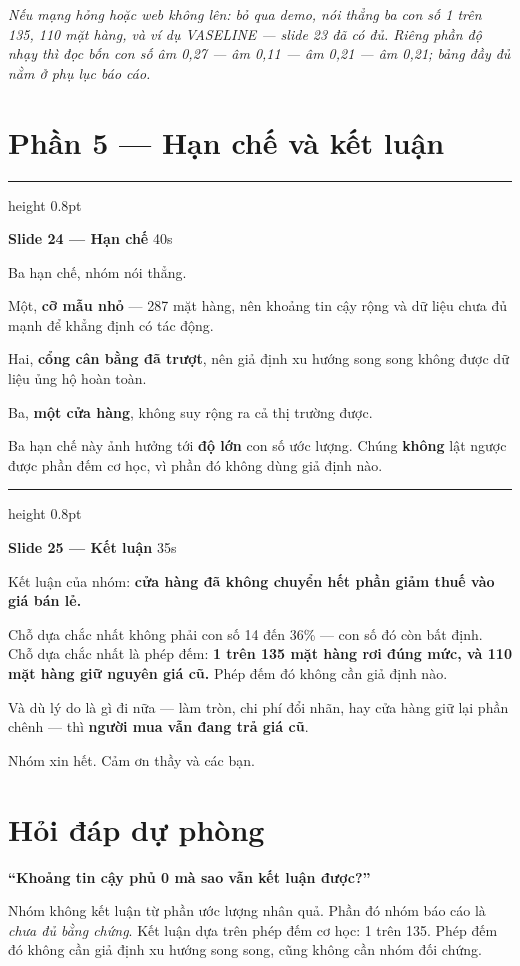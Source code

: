 \documentclass[12pt]{article}
\newcommand{\slidemuc}[4]{%
  \vspace{10pt}%
  {\color{vach}\hrule height 0.8pt}%
  \vspace{4pt}%
  {\large\bfseries Slide #1 — #2}%
  \hfill{\color{xam}\normalsize #3}%
  \ifx\relax#4\relax\else\\[2pt]{\bfseries\small #4}\fi%
  \vspace{4pt}\par%
}
\newenvironment{noi}%
  {\vspace{3pt}\begin{list}{}{%
     \setlength{\leftmargin}{14pt}\setlength{\rightmargin}{0pt}%
     \setlength{\itemindent}{0pt}\setlength{\listparindent}{0pt}%
     \setlength{\parsep}{5pt}}\item[]%
   \color{black}}%
  {\end{list}\vspace{2pt}}
\newcommand{\chidan}[1]{{\color{xam}\small\emph{#1}}\par}
\begin{document}
\chidan{Nếu mạng hỏng hoặc web không lên: bỏ qua demo, nói thẳng ba con số 1 trên
135, 110 mặt hàng, và ví dụ VASELINE --- slide 23 đã có đủ. Riêng phần độ nhạy thì
đọc bốn con số âm 0,27 --- âm 0,11 --- âm 0,21 --- âm 0,21; bảng đầy đủ nằm ở phụ lục
báo cáo.}

\section*{Phần 5 --- Hạn chế và kết luận}

\slidemuc{24}{Hạn chế}{40s}{\relax}
\begin{noi}
Ba hạn chế, nhóm nói thẳng.

Một, \textbf{cỡ mẫu nhỏ} --- 287 mặt hàng, nên khoảng tin cậy rộng và dữ liệu chưa
đủ mạnh để khẳng định có tác động.

Hai, \textbf{cổng cân bằng đã trượt}, nên giả định xu hướng song song không được dữ
liệu ủng hộ hoàn toàn.

Ba, \textbf{một cửa hàng}, không suy rộng ra cả thị trường được.

Ba hạn chế này ảnh hưởng tới \textbf{độ lớn} con số ước lượng. Chúng \textbf{không}
lật ngược được phần đếm cơ học, vì phần đó không dùng giả định nào.
\end{noi}

\slidemuc{25}{Kết luận}{35s}{\relax}
\begin{noi}
Kết luận của nhóm: \textbf{cửa hàng đã không chuyển hết phần giảm thuế vào giá bán
lẻ.}

Chỗ dựa chắc nhất không phải con số 14 đến 36\% --- con số đó còn bất định. Chỗ dựa
chắc nhất là phép đếm: \textbf{1 trên 135 mặt hàng rơi đúng mức, và 110 mặt hàng
giữ nguyên giá cũ.} Phép đếm đó không cần giả định nào.

Và dù lý do là gì đi nữa --- làm tròn, chi phí đổi nhãn, hay cửa hàng giữ lại phần
chênh --- thì \textbf{người mua vẫn đang trả giá cũ}.

Nhóm xin hết. Cảm ơn thầy và các bạn.
\end{noi}

\newpage
\section*{Hỏi đáp dự phòng}

\textbf{``Khoảng tin cậy phủ 0 mà sao vẫn kết luận được?''}
\begin{noi}
Nhóm không kết luận từ phần ước lượng nhân quả. Phần đó nhóm báo cáo là \emph{chưa
đủ bằng chứng}. Kết luận dựa trên phép đếm cơ học: 1 trên 135. Phép đếm đó không
cần giả định xu hướng song song, cũng không cần nhóm đối chứng.
\end{noi}
\end{document}
